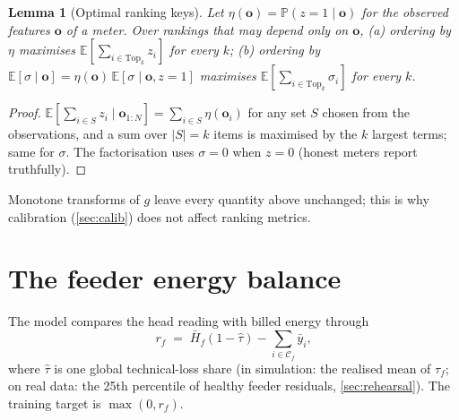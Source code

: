 \documentclass[11pt,a4paper]{article}
\theoremstyle{plain}
\newtheorem{lemma}{Lemma}
\theoremstyle{definition}
\theoremstyle{remark}
\newcommand{\E}{\mathbb{E}}
\newcommand{\Prob}{\mathbb{P}}
\begin{document}
\begin{lemma}[Optimal ranking keys]
\label{lem:keys}
Let $\eta(\bm o)=\Prob(z=1\mid \bm o)$ for the observed features $\bm o$ of a meter. Over rankings that may depend only on $\bm o$, (a) ordering by $\eta$ maximises $\E[\sum_{i\in\mathrm{Top}_k}z_i]$ for every $k$; (b) ordering by $\E[\sigma\mid\bm o]=\eta(\bm o)\,\E[\sigma\mid \bm o,z=1]$ maximises $\E[\sum_{i\in\mathrm{Top}_k}\sigma_i]$ for every $k$.
\end{lemma}
\begin{proof}
$\E[\sum_{i\in S}z_i\mid \bm o_{1:N}]=\sum_{i\in S}\eta(\bm o_i)$ for any set $S$ chosen from the observations, and a sum over $|S|=k$ items is maximised by the $k$ largest terms; same for $\sigma$. The factorisation uses $\sigma=0$ when $z=0$ (honest meters report truthfully).
\end{proof}
Monotone transforms of $g$ leave every quantity above unchanged; this is why calibration (\cref{sec:calib}) does not affect ranking metrics.

\section{The feeder energy balance}
\label{sec:balance}
The model compares the head reading with billed energy through
\begin{equation}
r_f \;=\; \bar H_f(1-\hat\tau)-\sum_{i\in\mathcal C_f}\bar y_i ,
\label{eq:resid}
\end{equation}
where $\hat\tau$ is one global technical-loss share (in simulation: the realised mean of $\tau_f$; on real data: the 25th percentile of healthy feeder residuals, \cref{sec:rehearsal}). The training target is $\max(0,r_f)$.
\end{document}

